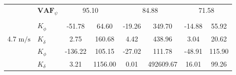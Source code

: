 \begin{table}[]
\begin{tabular}{llcccccc}
                                                   & $\mathbf{VAF}_\psi$                                    & \multicolumn{2}{c}{95.10}                                                                          & \multicolumn{2}{c}{84.88}                                                                          & \multicolumn{2}{c}{71.58}                                                                          \\
                                                   &                                                        & \multicolumn{1}{l}{}                        & \multicolumn{1}{l}{}                                 & \multicolumn{1}{l}{}                        & \multicolumn{1}{l}{}                                 & \multicolumn{1}{l}{}                        & \multicolumn{1}{l}{}                                 \\ \hline
                                                   & $K_{\dot{\phi}} $                                      & -51.78                                      & 64.60                                                & -19.26                                      & 349.70                                               & -14.88                                      & 55.92                                                \\
    \multirow{-2}{*}{4.7 $\si{\meter\per\second}$} & $K_{\dot{\delta}}$                                     & 2.75                                        & 160.68                                               & 4.42                                        & 438.96                                               & 3.04                                        & 20.62                                                \\
                                                   & $K_{\phi} $                                            & -136.22                                     & 105.15                                               & -27.02                                      & 111.78                                               & -48.91                                      & 115.90                                               \\
                                                   & $K_\delta $                                            & 3.21                                        & 1156.00                                              & 0.01                                        & 492609.67                                            & 16.01                                       & 99.26                                                \\

\end{tabular}
\end{table}
